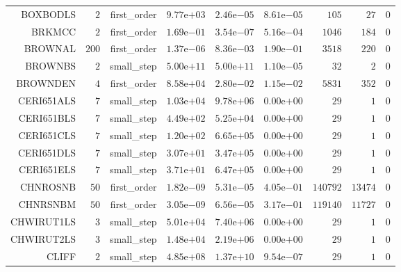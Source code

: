 \begin{longtable}{rrrrrrrrr}
BOXBODLS & \(     2\) & first\_order & \( 9.77\)e\(+03\) & \( 2.46\)e\(-05\) & \( 8.61\)e\(-05\) & \(   105\) & \(    27\) & \(     0\) \\
BRKMCC & \(     2\) & first\_order & \( 1.69\)e\(-01\) & \( 3.54\)e\(-07\) & \( 5.16\)e\(-04\) & \(  1046\) & \(   184\) & \(     0\) \\
BROWNAL & \(   200\) & first\_order & \( 1.37\)e\(-06\) & \( 8.36\)e\(-03\) & \( 1.90\)e\(-01\) & \(  3518\) & \(   220\) & \(     0\) \\
BROWNBS & \(     2\) & small\_step & \( 5.00\)e\(+11\) & \( 5.00\)e\(+11\) & \( 1.10\)e\(-05\) & \(    32\) & \(     2\) & \(     0\) \\
BROWNDEN & \(     4\) & first\_order & \( 8.58\)e\(+04\) & \( 2.80\)e\(-02\) & \( 1.15\)e\(-02\) & \(  5831\) & \(   352\) & \(     0\) \\
CERI651ALS & \(     7\) & small\_step & \( 1.03\)e\(+04\) & \( 9.78\)e\(+06\) & \( 0.00\)e\(+00\) & \(    29\) & \(     1\) & \(     0\) \\
CERI651BLS & \(     7\) & small\_step & \( 4.49\)e\(+02\) & \( 5.25\)e\(+04\) & \( 0.00\)e\(+00\) & \(    29\) & \(     1\) & \(     0\) \\
CERI651CLS & \(     7\) & small\_step & \( 1.20\)e\(+02\) & \( 6.65\)e\(+05\) & \( 0.00\)e\(+00\) & \(    29\) & \(     1\) & \(     0\) \\
CERI651DLS & \(     7\) & small\_step & \( 3.07\)e\(+01\) & \( 3.47\)e\(+05\) & \( 0.00\)e\(+00\) & \(    29\) & \(     1\) & \(     0\) \\
CERI651ELS & \(     7\) & small\_step & \( 3.71\)e\(+01\) & \( 6.47\)e\(+05\) & \( 0.00\)e\(+00\) & \(    29\) & \(     1\) & \(     0\) \\
CHNROSNB & \(    50\) & first\_order & \( 1.82\)e\(-09\) & \( 5.31\)e\(-05\) & \( 4.05\)e\(-01\) & \(140792\) & \( 13474\) & \(     0\) \\
CHNRSNBM & \(    50\) & first\_order & \( 3.05\)e\(-09\) & \( 6.56\)e\(-05\) & \( 3.17\)e\(-01\) & \(119140\) & \( 11727\) & \(     0\) \\
CHWIRUT1LS & \(     3\) & small\_step & \( 5.01\)e\(+04\) & \( 7.40\)e\(+06\) & \( 0.00\)e\(+00\) & \(    29\) & \(     1\) & \(     0\) \\
CHWIRUT2LS & \(     3\) & small\_step & \( 1.48\)e\(+04\) & \( 2.19\)e\(+06\) & \( 0.00\)e\(+00\) & \(    29\) & \(     1\) & \(     0\) \\
CLIFF & \(     2\) & small\_step & \( 4.85\)e\(+08\) & \( 1.37\)e\(+10\) & \( 9.54\)e\(-07\) & \(    29\) & \(     1\) & \(     0\) \\

\end{longtable}
